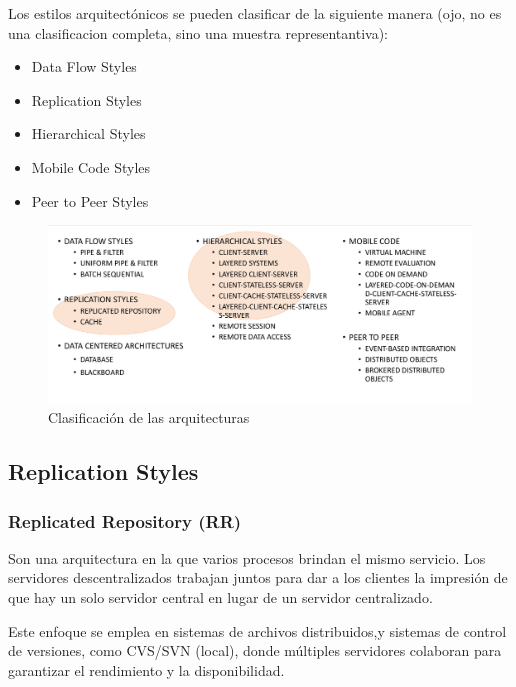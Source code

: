\documentclass{article}
\begin{document}
		Los estilos arquitectónicos se pueden clasificar de la siguiente manera (ojo, no es una clasificacion completa, sino una muestra representantiva): 
		
		\begin{itemize}	
			\item {Data Flow Styles}
			\item {Replication Styles}
			\item {Hierarchical Styles}
			\item {Mobile Code Styles}
			\item {Peer to Peer Styles}
		\end{itemize}
		
		\begin{figure}[h]
			\centering
			\includegraphics[width=1\textwidth]{clasificacion_arquitecturas.png}
			\caption{Clasificación de las arquitecturas}
		\end{figure}
		
		\subsection{Replication Styles}
		\subsubsection{Replicated Repository (RR)}
		Son una arquitectura en la que varios procesos brindan el mismo servicio. Los servidores descentralizados trabajan juntos para dar a los clientes la impresión de que hay un solo servidor central en lugar de un servidor centralizado.
		
		Este enfoque se emplea en sistemas de archivos distribuidos,y sistemas de control de versiones, como CVS/SVN (local), donde múltiples servidores colaboran para garantizar el rendimiento y la disponibilidad.
		
\end{document}
